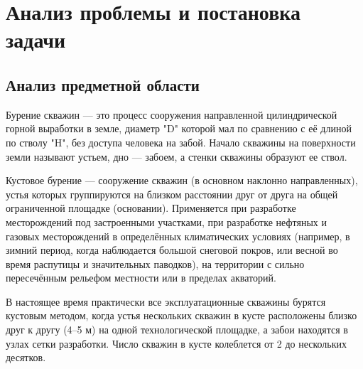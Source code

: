 \newpage
\section{Анализ проблемы и постановка задачи}
\subsection{Анализ предметной области}
Бурение скважин — это процесс сооружения направленной цилиндрической горной выработки в земле, диаметр "D" которой мал по сравнению с её длиной по стволу "H",
без доступа человека на забой. Начало скважины на поверхности земли называют устьем, дно — забоем, а стенки скважины образуют ее ствол.

Кустовое бурение — сооружение скважин (в основном наклонно направленных), устья которых группируются на близком расстоянии друг от друга на общей ограниченной
площадке (основании). Применяется при разработке месторождений под застроенными участками, при разработке нефтяных и газовых месторождений в определённых
климатических условиях (например, в зимний период, когда наблюдается большой снеговой покров, или весной во время распутицы и значительных паводков),
на территории с сильно пересечённым рельефом местности или в пределах акваторий.

В настоящее время практически все эксплуатационные скважины бурятся кустовым методом, когда устья нескольких скважин в кусте расположены близко друг к другу (4–5
м) на одной технологической площадке, а забои находятся в узлах сетки разработки. Число скважин в кусте колеблется от  2 до нескольких десятков.

